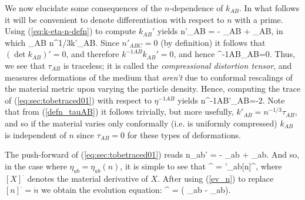 We now elucidate some consequences of the $n$-dependence of $k_{AB}$.
In what follows it will be convenient to denote differentiation with respect to $n$ with a prime. Using (\ref{eq:k-eta-n-defn}) to compute $k_{AB}'$ yields
\bea
\label{eq:sec:tobetraced01}
n\eta'_{AB} = - \eta_{AB} + \tau_{AB},
\eea
in which
\bea
\label{defn_tauAB}
\tau_{AB}  n^{1/3}k'_{AB}.
\eea
Since $n'_{ABC}=0$ (by definition) it follows that $(\det k_{AB})'=0$, and therefore $k^{-1AB}k_{AB}'=0$, and hence
\bea
\eta^{-1AB}\tau_{AB}=0.
\eea
Thus, we see that $\tau_{AB}$ is   traceless; it is called the \textit{compressional distortion tensor}, and measures   deformations of the medium that \textit{aren't} due to conformal rescalings of the material metric upon varying the particle density.
Hence, computing the trace of (\ref{eq:sec:tobetraced01}) with respect to $\eta^{-1AB}$ yields
\bea
n\eta^{-1AB}\eta'_{AB}=-2.
\eea
Note that from (\ref{defn_tauAB}) it follows trivially, but more usefully, $k'_{AB} = n^{-1/3}\tau_{AB}$, and so if the material varies only  conformally (i.e. is uniformly compressed) $k_{AB}$ is independent of $n$ since $\tau_{AB}=0$ for these types of deformations.


The push-forward of (\ref{eq:sec:tobetraced01}) reads
\bea
n\eta_{ab}' = - \eta_{ab} + \tau_{ab}.
\eea
And so, in the case where $\eta_{ab} = \eta_{ab}(n)$, it is simple to see that
\bea
[{\eta}_{ab}]^{\cdot} = \eta'_{ab}[n]^{\cdot},
\eea
where $[X]^{\cdot}$ denotes the material derivative of $X$. After using (\ref{ev_n}) to replace $[n]^{\cdot}=\dot{n}$ we obtain the evolution equation:
\bea
[{\eta}_{ab}]^{\cdot} =  \left( \eta_{ab} - \tau_{ab}\right)\Theta.
\eea



